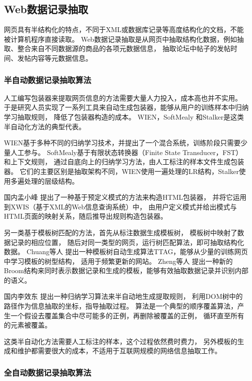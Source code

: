 \subsection{Web数据记录抽取}
网页具有半结构化的特点，不同于XML或数据库记录等高度结构化的文档，不能被计算机程序直接读取。
Web数据记录抽取是从网页中抽取结构化数据，例如抽取、整合来自不同数据源的商品的各项元数据信息，
抽取论坛中帖子的发帖时间、发帖内容等元数据信息。

\subsubsection{半自动数据记录抽取算法}

人工编写包装器来提取网页信息的方法需要大量人力投入，成本高也并不实用。
于是研究人员实现了一系列工具来自动生成包装器，能够从用户的训练样本中归纳学习抽取规则，
降低了包装器构造的成本。
WIEN，SoftMealy
和Stalker是这类半自动化方法的典型代表。

WIEN基于多种不同的归纳学习技术，并提出了一个混合系统，训练阶段只需要少量人工参与。
SoftMealy基于有限状态转换器（Finite State Transducer，FST）和上下文规则，
通过自底向上的归纳学习方法，由人工标注的样本文件生成包装器。
它们的主要区别是抽取架构不同，WIEN使用一遍处理的LR结构，Stalker使用多遍处理的层级结构。

国内孟小峰
提出了一种基于预定义模式的方法来构造HTML包装器，
并将它运用到XWIS（基于XML的Web信息查询系统）中，
由用户定义模式并给出模式与HTML页面的映射关系，随后推导出规则构造包装器。

另一类基于模板树匹配的方法，首先从标注数据生成模板树，
模板树中映射了数据记录的相应位置，
随后对同一类型的网页，运行树匹配算法，即可抽取结构化数据。
Chuang等人
提出一种模板树自动生成算法TTAG，能够从少量的训练网页中学习模板的树型结构，
适用于频繁更新的网站。
Zheng等人
提出一种新的Broom结构来同时表示数据记录和生成的模板，能够有效抽取数据记录并识别内部的语义。

国内李效东
提出一种归纳学习算法来半自动地生成提取规则，
利用DOM树中的路径作为信息抽取的坐标，指导抽取过程。
算法是一个典型的顺序覆盖算法，产生一个假设去覆盖集合中尽可能多的正例，再删除被覆盖的正例，
循环直至所有的元素被覆盖。

这类半自动化方法需要人工标注的样本，这个过程依然费时费力，
另外模板的生成和维护都需要很大的成本，不适用于互联网规模的网络信息抽取工作。

\subsubsection{全自动数据记录抽取算法}

